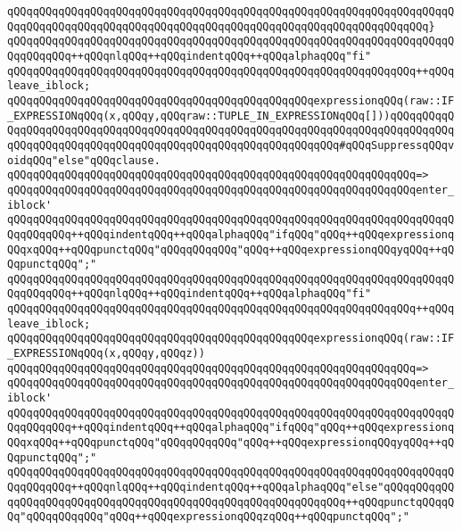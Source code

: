 \verb|qQQqqQQqqQQqqQQqqQQqqQQqqQQqqQQqqQQqqQQqqQQqqQQqqQQqqQQqqQQqqQQqqQQqqQQqqQQqqQQqqQQqqQQqqQQqqQQqqQQqqQQqqQQqqQQqqQQqqQQqqQQqqQQqqQQqqQQq}|\newline
\verb|qQQqqQQqqQQqqQQqqQQqqQQqqQQqqQQqqQQqqQQqqQQqqQQqqQQqqQQqqQQqqQQqqQQqqQQqqQQqqQQq++qQQqnlqQQq++qQQqindentqQQq++qQQqalphaqQQq"fi"|\newline
\verb|qQQqqQQqqQQqqQQqqQQqqQQqqQQqqQQqqQQqqQQqqQQqqQQqqQQqqQQqqQQqqQQq++qQQqleave_iblock;|\newline
\newline
\verb|qQQqqQQqqQQqqQQqqQQqqQQqqQQqqQQqqQQqqQQqqQQqqQQqexpressionqQQq(raw::IF_EXPRESSIONqQQq(x,qQQqy,qQQqraw::TUPLE_IN_EXPRESSIONqQQq[]))qQQqqQQqqQQqqQQqqQQqqQQqqQQqqQQqqQQqqQQqqQQqqQQqqQQqqQQqqQQqqQQqqQQqqQQqqQQqqQQqqQQqqQQqqQQqqQQqqQQqqQQqqQQqqQQqqQQqqQQqqQQqqQQqqQQq#qQQqSuppressqQQqvoidqQQq"else"qQQqclause.|\newline
\verb|qQQqqQQqqQQqqQQqqQQqqQQqqQQqqQQqqQQqqQQqqQQqqQQqqQQqqQQqqQQqqQQq=>|\newline
\verb|qQQqqQQqqQQqqQQqqQQqqQQqqQQqqQQqqQQqqQQqqQQqqQQqqQQqqQQqqQQqqQQqenter_iblock'|\newline
\verb|qQQqqQQqqQQqqQQqqQQqqQQqqQQqqQQqqQQqqQQqqQQqqQQqqQQqqQQqqQQqqQQqqQQqqQQqqQQqqQQq++qQQqindentqQQq++qQQqalphaqQQq"ifqQQq"qQQq++qQQqexpressionqQQqxqQQq++qQQqpunctqQQq"qQQqqQQqqQQq"qQQq++qQQqexpressionqQQqyqQQq++qQQqpunctqQQq";"|\newline
\verb|qQQqqQQqqQQqqQQqqQQqqQQqqQQqqQQqqQQqqQQqqQQqqQQqqQQqqQQqqQQqqQQqqQQqqQQqqQQqqQQq++qQQqnlqQQq++qQQqindentqQQq++qQQqalphaqQQq"fi"|\newline
\verb|qQQqqQQqqQQqqQQqqQQqqQQqqQQqqQQqqQQqqQQqqQQqqQQqqQQqqQQqqQQqqQQq++qQQqleave_iblock;|\newline
\newline
\verb|qQQqqQQqqQQqqQQqqQQqqQQqqQQqqQQqqQQqqQQqqQQqqQQqexpressionqQQq(raw::IF_EXPRESSIONqQQq(x,qQQqy,qQQqz))|\newline
\verb|qQQqqQQqqQQqqQQqqQQqqQQqqQQqqQQqqQQqqQQqqQQqqQQqqQQqqQQqqQQqqQQq=>|\newline
\verb|qQQqqQQqqQQqqQQqqQQqqQQqqQQqqQQqqQQqqQQqqQQqqQQqqQQqqQQqqQQqqQQqenter_iblock'|\newline
\verb|qQQqqQQqqQQqqQQqqQQqqQQqqQQqqQQqqQQqqQQqqQQqqQQqqQQqqQQqqQQqqQQqqQQqqQQqqQQqqQQq++qQQqindentqQQq++qQQqalphaqQQq"ifqQQq"qQQq++qQQqexpressionqQQqxqQQq++qQQqpunctqQQq"qQQqqQQqqQQq"qQQq++qQQqexpressionqQQqyqQQq++qQQqpunctqQQq";"|\newline
\verb|qQQqqQQqqQQqqQQqqQQqqQQqqQQqqQQqqQQqqQQqqQQqqQQqqQQqqQQqqQQqqQQqqQQqqQQqqQQqqQQq++qQQqnlqQQq++qQQqindentqQQq++qQQqalphaqQQq"else"qQQqqQQqqQQqqQQqqQQqqQQqqQQqqQQqqQQqqQQqqQQqqQQqqQQqqQQqqQQqqQQq++qQQqpunctqQQqqQQq"qQQqqQQqqQQq"qQQq++qQQqexpressionqQQqzqQQq++qQQqpunctqQQq";"|\newline
